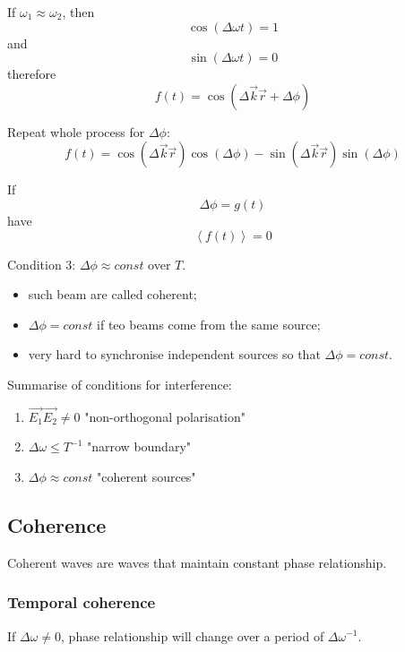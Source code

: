 \documentclass[10pt]{article}
\begin{document}
If $\omega_1 \approx \omega_2$, then
\begin{equation*}
\cos{(\Delta \omega t)} = 1
\end{equation*}
and
\begin{equation*}
\sin{(\Delta \omega t)} = 0
\end{equation*}
therefore
\begin{equation*}
f(t) = \cos{(\Delta \vec{k}\vec{r} + \Delta \phi)}
\end{equation*}

Repeat whole process for $\Delta \phi$:
\begin{equation*}
f(t) = \cos{(\Delta \vec{k}\vec{r})} \cos{(\Delta \phi)} - \sin{(\Delta \vec{k}\vec{r})} \sin{(\Delta \phi)}
\end{equation*}

If
\begin{equation*}
\Delta \phi = g(t)
\end{equation*}
have
\begin{equation*}
\left\langle f(t)\right\rangle = 0
\end{equation*}

Condition $3$: $\Delta \phi \approx const$ over $T$.
\begin{itemize}
\item such beam are called coherent;
\item $\Delta \phi = const$ if teo beams come from the same source;
\item very hard to synchronise independent sources so that $\Delta \phi = const$.
\end{itemize}

Summarise of conditions for interference:
\begin{enumerate}
\item $\vec{E_1} \vec{E_2} \neq 0$ "non-orthogonal polarisation"
\item $\Delta \omega \leq T^{-1}$ "narrow boundary"
\item $\Delta \phi \approx const$ "coherent sources"
\end{enumerate}

\subsection{Coherence}
Coherent waves are waves that maintain constant phase relationship.

\subsubsection{Temporal coherence}
If $\Delta \omega \neq 0$, phase relationship will change over a period of $\Delta \omega^{-1}$.
\end{document}
